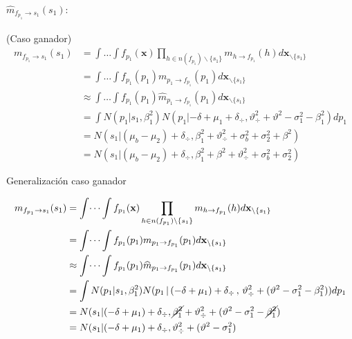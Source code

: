 \documentclass[11pt,twoside, spanish]{report} %
\begin{document}


\paragraph{$\widehat{m}_{f_{p_1} \rightarrow s_1}(s_1):$} (Caso ganador)
\begin{equation}
	\begin{split}
		m_{f_{p_1} \rightarrow s_1}(s_1) & = \int \dots \int f_{p_1}(\textbf{x}) \prod_{h \in n(f_{p_1}) \backslash \{s_1\} } m_{h \rightarrow f_{p_1}}(h)  d\textbf{x}_{\backslash \{s_1\} }  \\
		&= \int \dots \int f_{p_1}(p_1)m_{p_1 \rightarrow f_{p_1}}(p_1) d\textbf{x}_{\backslash \{s_1\} }  \\
		&\approx \int \dots \int f_{p_1}(p_1)\widehat{m}_{p_1 \rightarrow f_{p_1}}(p_1) d\textbf{x}_{\backslash \{s_1\} }  \\
		&= \int  N(p_1| s_1, \beta_1^2)  N( p_1 |  -\delta + \mu_1 + \delta_{\div} ,\vartheta_{\div}^2 + \vartheta^2 -\sigma_1^2 - \beta_1^2)   dp_1 \\
		&=  N( s_1|(\mu_b - \mu_2) + \delta_{\div} , \beta_1^2+\vartheta_{\div}^2 + \sigma_b^2 + \sigma_2^2 + \beta^2) \\
		&=  N( s_1|(\mu_b - \mu_2) + \delta_{\div} ,\beta_1^2+ \beta^2+\vartheta_{\div}^2 + \sigma_b^2 + \sigma_2^2)
	\end{split}
\end{equation}

Generalizaci\'on caso ganador

\begin{equation}
	\begin{split}
		m_{f_{p_1} \rightarrow s_1}(s_1) & = \int \dots \int f_{p_1}(\textbf{x}) \prod_{h \in n(f_{p_1}) \backslash \{s_1\} } m_{h \rightarrow f_{p_1}}(h)  d\textbf{x}_{\backslash \{s_1\} }  \\
		&= \int \dots \int f_{p_1}(p_1)m_{p_1 \rightarrow f_{p_1}}(p_1) d\textbf{x}_{\backslash \{s_1\} }  \\
		&\approx \int \dots \int f_{p_1}(p_1)\widehat{m}_{p_1 \rightarrow f_{p_1}}(p_1)d\textbf{x}_{\backslash \{s_1\} }  \\
		&=\int  N(p_1| s_1, \beta_1^2) N( p_1 \,|\, (-\delta + \mu_1) + \delta_{\div}  \,,\,\vartheta_{\div}^2 + (\vartheta^2 - \sigma_1^2 - \beta_1^2))dp_1\\
		&=  N( s_1| (-\delta + \mu_1) + \delta_{\div} , \cancel{\beta_1^2}+\vartheta_{\div}^2 + (\vartheta^2 - \sigma_1^2 - \cancel{\beta_1^2}) \\
		&=  N( s_1| (-\delta + \mu_1) + \delta_{\div} ,\vartheta_{\div}^2 + (\vartheta^2 - \sigma_1^2 )
	\end{split}
\end{equation}
\end{document}
